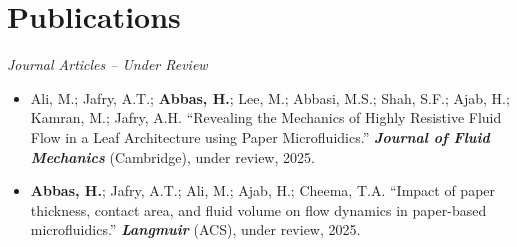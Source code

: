 \documentclass[11pt,a4paper]{article}
\begin{document}
\section{Publications}

\textit{Journal Articles -- Under Review}
\begin{itemize}
  \item Ali, M.; Jafry, A.T.; \textbf{Abbas, H.}; Lee, M.; Abbasi, M.S.; Shah,
        S.F.; Ajab, H.; Kamran, M.; Jafry, A.H. ``Revealing the Mechanics of
        Highly Resistive Fluid Flow in a Leaf Architecture using Paper
        Microfluidics.''
        \textbf{\textit{Journal of Fluid Mechanics}} (Cambridge), under review,
        2025.
  \item \textbf{Abbas, H.}; Jafry, A.T.; Ali, M.; Ajab, H.; Cheema, T.A.
        ``Impact of paper thickness, contact area, and fluid volume on flow
        dynamics in paper-based microfluidics.''
        \textbf{\textit{Langmuir}} (ACS), under review, 2025.
\end{itemize}
\end{document}
